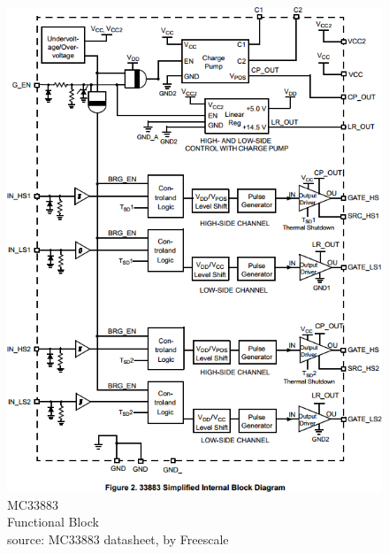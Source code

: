 \documentclass{beamer}
\begin{document}
\begin{frame}
\begin{columns}[t]
\begin{figure}
  \centering
  \includegraphics[width=1.0\columnwidth]{images-dis3/mc33883-blockdiagram} \\
  MC33883 \\ Functional Block \\
  {\tiny source: MC33883 datasheet, by Freescale}
\end{figure}
\end{columns}
\end{frame}
\end{document}
